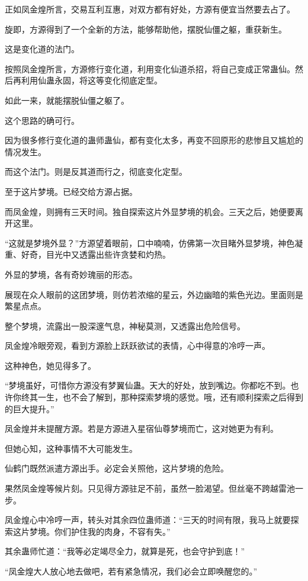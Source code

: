 \begin{this_body}
正如凤金煌所言，交易互利互惠，对双方都有好处，方源有便宜当然要去占了。

旋即，方源得到了一个全新的方法，能够帮助他，摆脱仙僵之躯，重获新生。

这是变化道的法门。

按照凤金煌所言，方源修行变化道，利用变化仙道杀招，将自己变成正常蛊仙。然后再利用仙蛊永固，将这等变化彻底定型。

如此一来，就能摆脱仙僵之躯了。

这个思路的确可行。

因为很多修行变化道的蛊师蛊仙，都有变化太多，再变不回原形的悲惨且又尴尬的情况发生。

而这个法门。则是反其道而行之，彻底变化定型。

至于这片梦境。已经交给方源占据。

而凤金煌，则拥有三天时间。独自探索这片外显梦境的机会。三天之后，她便要离开这里。

“这就是梦境外显？”方源望着眼前，口中喃喃，仿佛第一次目睹外显梦境，神色凝重、好奇，目光中又透露出些许贪婪和灼热。

外显的梦境，各有奇妙瑰丽的形态。

展现在众人眼前的这团梦境，则仿若浓缩的星云，外边幽暗的紫色光边。里面则是繁星点点。

整个梦境，流露出一股深邃气息，神秘莫测，又透露出危险信号。

凤金煌冷眼旁观，看到方源脸上跃跃欲试的表情，心中得意的冷哼一声。

这种神色，她见得多了。

“梦境虽好，可惜你方源没有梦翼仙蛊。天大的好处，放到嘴边。你都吃不到。也许你终其一生，也不会了解到，那种探索梦境的感觉。哦，还有顺利探索之后得到的巨大提升。”

凤金煌并未提醒方源。若是方源进入星宿仙尊梦境而亡，这对她更为有利。

但她心知，这种事情不大可能发生。

仙鹤门既然派遣方源出手。必定会关照他，这片梦境的危险。

果然凤金煌等候片刻。只见得方源驻足不前，虽然一脸渴望。但丝毫不跨越雷池一步。

凤金煌心中冷哼一声，转头对其余四位蛊师道：“三天的时间有限，我马上就要探索这片梦境。你们护住我的肉身，不容有失。”

其余蛊师忙道：“我等必定竭尽全力，就算是死，也会守护到底！”

“凤金煌大人放心地去做吧，若有紧急情况，我们必会立即唤醒您的。”


\end{this_body}
